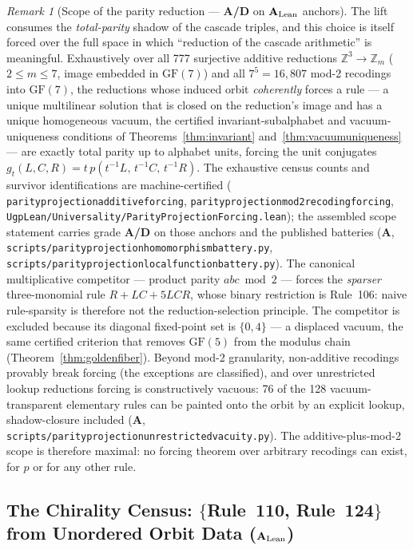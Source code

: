 \documentclass[11pt]{article}
\theoremstyle{remark}
\newtheorem{remark}[theorem]{Remark}
\newcommand{\GF}[1]{\ensuremath{\mathrm{GF}(#1)}}
\newcommand{\lean}[1]{%
  \penalty-100
  \begingroup\def\_{\textunderscore\allowbreak}\texttt{#1}\endgroup}
\newcommand{\CatA}{\textbf{A}}
\newcommand{\CatAL}{\texorpdfstring{\ensuremath{\textbf{A}_{\rm Lean}}}{A-Lean}}
\newcommand{\CatAD}{\textbf{A/D}}
\begin{document}
\begin{remark}[Scope of the parity reduction --- \CatAD{} on \CatAL{}
anchors]
\label{rem:phi-forcing-scope}
The lift consumes the \emph{total-parity} shadow of the cascade triples,
and this choice is itself forced over the full space in which
``reduction of the cascade arithmetic'' is meaningful. Exhaustively over
all 777 surjective additive reductions $\mathbb{Z}^3 \to \mathbb{Z}_m$
($2 \leq m \leq 7$, image embedded in $\GF{7}$) and all $7^5 = 16{,}807$
mod-2 recodings into $\GF{7}$, the reductions whose induced orbit
\emph{coherently} forces a rule --- a unique multilinear solution that is
closed on the reduction's image and has a unique homogeneous vacuum, the
certified invariant-subalphabet and vacuum-uniqueness conditions of
Theorems~\ref{thm:invariant} and~\ref{thm:vacuumuniqueness} --- are
exactly total parity up to alphabet units, forcing the unit conjugates
$g_t(L,C,R) = t\,p(t^{-1}L,\, t^{-1}C,\, t^{-1}R)$. The exhaustive census
counts and survivor identifications are machine-certified
(\lean{parity\_projection\_additive\_forcing},
\lean{parity\_projection\_mod2\_recoding\_forcing},
\lean{UgpLean/Universality/ParityProjectionForcing.lean}); the assembled
scope statement carries grade \CatAD{} on those anchors and the
published batteries (\CatA{},
\lean{scripts/parity\_projection\_homomorphism\_battery.py},
\lean{scripts/parity\_projection\_local\_function\_battery.py}).
The canonical multiplicative competitor --- product parity
$abc \bmod 2$ --- forces the \emph{sparser} three-monomial rule
$R + LC + 5LCR$, whose binary restriction is Rule~106: naive
rule-sparsity is therefore not the reduction-selection principle. The
competitor is excluded because its diagonal fixed-point set is
$\{0, 4\}$ --- a displaced vacuum, the same certified criterion that
removes $\GF{5}$ from the modulus chain
(Theorem~\ref{thm:goldenfiber}). Beyond mod-2 granularity, non-additive
recodings provably break forcing (the exceptions are classified), and
over unrestricted lookup reductions forcing is constructively vacuous:
76 of the 128 vacuum-transparent elementary rules can be painted onto
the orbit by an explicit lookup, shadow-closure included (\CatA{},
\lean{scripts/parity\_projection\_unrestricted\_vacuity.py}). The
additive-plus-mod-2 scope is therefore maximal: no forcing theorem over
arbitrary recodings can exist, for $p$ or for any other rule.
\end{remark}

\subsection{The Chirality Census:
\texorpdfstring{$\{$Rule~110, Rule~124$\}$}{\{Rule 110, Rule 124\}} from
Unordered Orbit Data (\CatAL{})}
\label{subsec:chirality-census}
\end{document}
